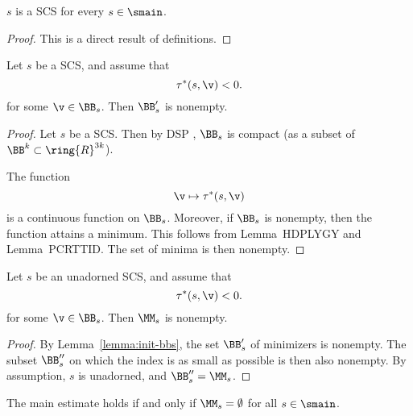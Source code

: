\begin{lemma}
$s$ is a SCS for every $s\in \smain$.
\end{lemma}

\begin{proof} This is a direct result of definitions.
\end{proof}


\begin{lemma}\label{lemma:init-bbs}
Let $s$ be a SCS, and assume that 
\[
\tau^*(s,\v)< 0.
\]
for some $\v\in \BB_s$.
Then $\BB'_s$ is nonempty.
\end{lemma}

\begin{proof} Let $s$ be a SCS. Then by DSP \cite{DSP},
$\BB_s$ is compact (as a subset of
$\BB^k \subset \ring{R}^{3k}$). 

 The function 
\[
\v\mapsto \tau^*(s,\v)
\]
is a continuous function on $\BB_s$.  Moreover, if $\BB_s$ is
nonempty, then the function attains a minimum.  This follows from Lemma~HDPLYGY %
and
Lemma~PCRTTID.  The set of minima is then nonempty.
\end{proof}

\begin{lemma}\label{lemma:init}
Let $s$ be an unadorned SCS, and assume that 
\[
\tau^*(s,\v)< 0.
\]
for some $\v\in \BB_s$.
Then $\MM_s$ is nonempty.
\end{lemma}

\begin{proof}    By Lemma~\ref{lemma:init-bbs}, the set 
$\BB'_s$ of minimizers is nonempty.   
The subset $\BB''_s$ on which the index is as small as possible
is then also nonempty.  By assumption, $s$  is unadorned, and
  $\BB''_s = \MM_s$.
\end{proof}


\begin{lemma}  
The main estimate holds if and only if $\MM_s=\emptyset$ for all $s\in\smain$.
\end{lemma}

